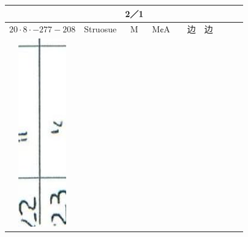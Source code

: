 \documentclass[10pt]{article}
\begin{document}
\begin{center}
\begin{tabular}{|c|c|c|c|c|c|c|c|c|c|}
 &  & 2／1 &  &  \\
\hline
\(20 \cdot 8 \cdot-277-208\) & Struosue & M & M¢A &  & 边 & 边 &  &  &  \\
\hline
\includegraphics[max width=\textwidth]{2025_02_27_dd68c3d38de88f0516d9g-096(9)}

\end{tabular}
\end{center}
\end{document}
